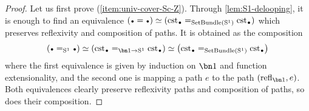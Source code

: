 \begin{proof}
  Let us first prove (\ref{item:univ-cover-Sc-Z}). Through
  \cref{lem:S1-delooping}, it is enough to find an equivalence
  $(\base = \base) \weq (\cst\base =_{\SetBundle(\Sc)} \cst\base)$
  which preserves reflexivity and composition of paths. It is obtained
  as the composition
  \begin{displaymath}
    \left(\base =_{\Sc} \base\right) \weq \left( \cst\base=_{\bn 1\to \Sc}\cst\base \right)
    \weq \left( \cst\base =_{\SetBundle(\Sc)} \cst\base \right)
  \end{displaymath}
  where the first equivalence is given by induction on $\bn 1$ and
  function extensionality, and the second one is mapping a path $e$ to
  the path $(\refl{\bn 1}, e)$. Both equivalences clearly preserve
  reflexivity paths and composition of paths, so does their
  composition.
  



\end{proof}
